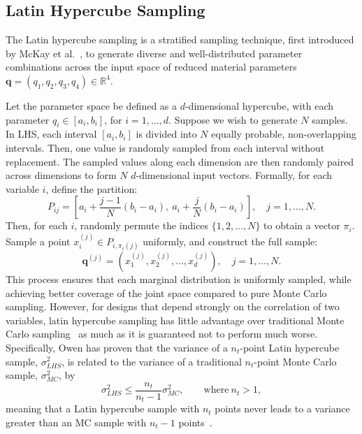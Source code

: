 \documentclass[a4paper,11pt]{article}
\begin{document}
\subsection{Latin Hypercube Sampling}
The Latin hypercube sampling is a stratified sampling technique, first introduced by McKay et al.~\cite{McKay}, to generate diverse and well-distributed parameter combinations across the input space of reduced material parameters $\mathbf{q} = (q_1, q_2, q_3, q_4) \in \mathbb{R}^4$.

Let the parameter space be defined as a $d$-dimensional hypercube, with each parameter \( q_i \in [a_i, b_i] \), for \( i = 1, \ldots, d \). Suppose we wish to generate \( N \) samples. In LHS, each interval \([a_i, b_i]\) is divided into \( N \) equally probable, non-overlapping intervals. Then, one value is randomly sampled from each interval without replacement. The sampled values along each dimension are then randomly paired across dimensions to form \( N \) $d$-dimensional input vectors. Formally, for each variable \( i \), define the partition:
\begin{equation}
P_{ij} = \left[ a_i + \frac{j-1}{N}(b_i - a_i),\ a_i + \frac{j}{N}(b_i - a_i) \right], \quad j = 1, \dots, N.
\end{equation}
Then, for each \( i \), randomly permute the indices \( \{1, 2, \dots, N\} \) to obtain a vector \( \pi_i \). Sample a point \( x_i^{(j)} \in P_{i,\pi_i(j)} \) uniformly, and construct the full sample:
\begin{equation}
\mathbf{q}^{(j)} = \left( x_1^{(j)}, x_2^{(j)}, \dots, x_d^{(j)} \right), \quad j = 1, \dots, N.
\end{equation}
This process ensures that each marginal distribution is uniformly sampled, while achieving better coverage of the joint space compared to pure Monte Carlo sampling. However, for designs that depend strongly on the correlation of two variables, latin hypercube sampling has little advantage over traditional Monte Carlo sampling~\cite{press1992} as much as it is guaranteed not to perform much worse. Specifically, Owen has proven that the variance of a $n_t$-point Latin hypercube sample, $\sigma^2_{LHS}$, is related to the variance of a traditional $n_t$-point Monte Carlo sample, $\sigma^2_{MC}$, by
\begin{equation}
	\sigma^2_{LHS} \leq \frac{n_t}{n_t -1}\sigma^2_{MC}, \qquad \text{where}\: n_t > 1,
	\label{eq:vlhs_vmc}  
\end{equation}
meaning that a Latin hypercube sample with $n_t$ points never leads to a variance greater than an MC sample with $n_t-1$ points~\cite{owen1997monte}.
\end{document}
